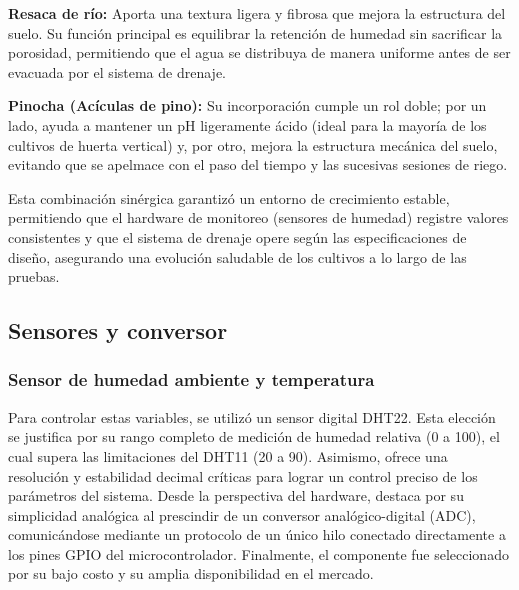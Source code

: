 \textbf{Resaca de río:} Aporta una textura ligera y fibrosa que mejora la estructura del suelo. Su función principal es equilibrar la retención de humedad sin sacrificar la porosidad, permitiendo que el agua se distribuya de manera uniforme antes de ser evacuada por el sistema de drenaje.

\textbf{Pinocha (Acículas de pino):} Su incorporación cumple un rol doble; por un lado, ayuda a mantener un pH ligeramente ácido (ideal para la mayoría de los cultivos de huerta vertical) y, por otro, mejora la estructura mecánica del suelo, evitando que se apelmace con el paso del tiempo y las sucesivas sesiones de riego.

Esta combinación sinérgica garantizó un entorno de crecimiento estable, permitiendo que el hardware de monitoreo (sensores de humedad) registre valores consistentes y que el sistema de drenaje opere según las especificaciones de diseño, asegurando una evolución saludable de los cultivos a lo largo de las pruebas.

\subsection{Sensores y conversor}

\subsubsection{Sensor de humedad ambiente y temperatura}
Para controlar estas variables, se utilizó un sensor digital DHT22. Esta elección se justifica por su rango completo de medición de humedad relativa (0 a 100), el cual supera las limitaciones del DHT11 (20 a 90). Asimismo, ofrece una resolución y estabilidad decimal críticas para lograr un control preciso de los parámetros del sistema. Desde la perspectiva del hardware, destaca por su simplicidad analógica al prescindir de un conversor analógico-digital (ADC), comunicándose mediante un protocolo de un único hilo conectado directamente a los pines GPIO del microcontrolador. Finalmente, el componente fue seleccionado por su bajo costo y su amplia disponibilidad en el mercado.

